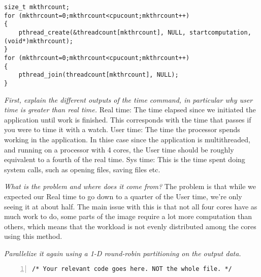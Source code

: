 \documentclass{article}
\begin{document}
\begin{ExerciseList}
\begin{lstlisting}
size_t mkthrcount;
for (mkthrcount=0;mkthrcount<cpucount;mkthrcount++)
{
	pthread_create(&threadcount[mkthrcount], NULL, startcomputation, (void*)mkthrcount);
}
for (mkthrcount=0;mkthrcount<cpucount;mkthrcount++)
{
	pthread_join(threadcount[mkthrcount], NULL);
}
\end{lstlisting}

\Question
{}
\emph{First, explain the different outputs of the time command, in
  particular why user time is greater than real time.}
\Answer Real time: The time elapsed since we initiated the application until work is finished. This corresponds with the time that passes if you were to time it with a watch. \newline
User time: The time the processor spends working in the application. In thise case since the application is multithreaded, and running on a processor with 4 cores, the User time should be roughly equivalent to a fourth of the real time. \newline
Sys time: This is the time spent doing system calls, such as opening files, saving files etc.

\Question
{} \emph{What is the problem and where does it come from?}
\Answer The problem is that while we expected our Real time to go down to a quarter of the User time, we're only seeing it at about half. The main issue with this is that not all four cores have as much work to do, some parts of the image require a lot more computation than others, which means that the workload is not evenly distributed among the cores using this method.

\Question
\emph{Parallelize it again using a 1-D round-robin partitioning on the
  output data.}

\begin{lstlisting}[basicstyle=\small\sffamily,
keywords={break,case,const,continue,default,else,enum,
for,if,return,switch,while,do,long,void,int,float,double,
char,struct,typedef,include,size\_t},
keywordstyle={\color{blue}},
comment={[l]{//}}, morecomment={[s]{/*}{*/}}, commentstyle=\itshape,
columns={[l]flexible}, numbers=left, numberstyle=\tiny,
frameround=fftt, frame=shadowbox, captionpos=b,
caption={Parallelized computation of Mandelbrot's set.},
label=LST:mandelbrot2]
/* Your relevant code goes here. NOT the whole file. */
\end{lstlisting}

\end{ExerciseList}
\end{document}
